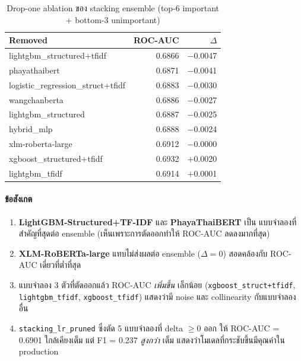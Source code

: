 \begin{table}[H]
\centering
\caption{Drop-one ablation ของ stacking ensemble (top-6 important + bottom-3 unimportant)}
\label{tab:drop-one}
\begin{tabularx}{\textwidth}{Xrr}
\toprule
\textbf{Removed} & \textbf{ROC-AUC} & \textbf{$\Delta$} \\
\midrule
lightgbm\_structured+tfidf  & 0.6866 & $-$0.0047 \\
phayathaibert               & 0.6871 & $-$0.0041 \\
logistic\_regression\_struct+tfidf & 0.6883 & $-$0.0030 \\
wangchanberta               & 0.6886 & $-$0.0027 \\
lightgbm\_structured        & 0.6887 & $-$0.0025 \\
hybrid\_mlp                 & 0.6888 & $-$0.0024 \\
\hdashline
xlm-roberta-large           & 0.6912 & $-$0.0000 \\
xgboost\_structured+tfidf   & 0.6932 & $+$0.0020 \\
lightgbm\_tfidf             & 0.6914 & $+$0.0001 \\
\bottomrule
\end{tabularx}
\end{table}

\paragraph{ข้อสังเกต}
\begin{enumerate}[leftmargin=2em]
  \item \textbf{LightGBM-Structured+TF-IDF} และ \textbf{PhayaThaiBERT} เป็น
        แบบจำลองที่สำคัญที่สุดต่อ ensemble (เห็นเพราะการตัดออกทำให้ ROC-AUC
        ลดลงมากที่สุด)
  \item \textbf{XLM-RoBERTa-large} แทบไม่ส่งผลต่อ ensemble ($\Delta = 0$)
        สอดคล้องกับ ROC-AUC เดี่ยวที่ต่ำที่สุด
  \item แบบจำลอง 3 ตัวที่ตัดออกแล้ว ROC-AUC \emph{เพิ่มขึ้น} เล็กน้อย
        (\texttt{xgboost\_struct+tfidf}, \texttt{lightgbm\_tfidf},
        \texttt{xgboost\_tfidf}) แสดงว่ามี noise และ collinearity กับแบบจำลอง
        อื่น
  \item \texttt{stacking\_lr\_pruned} ซึ่งตัด 5 แบบจำลองที่ delta $\geq 0$ ออก
        ให้ ROC-AUC = 0.6901 ใกล้เคียงเต็ม แต่ F1 = 0.237 \emph{สูงกว่า} เต็ม
        แสดงว่าโมเดลที่กระชับขึ้นมีคุณค่าใน production
\end{enumerate}

